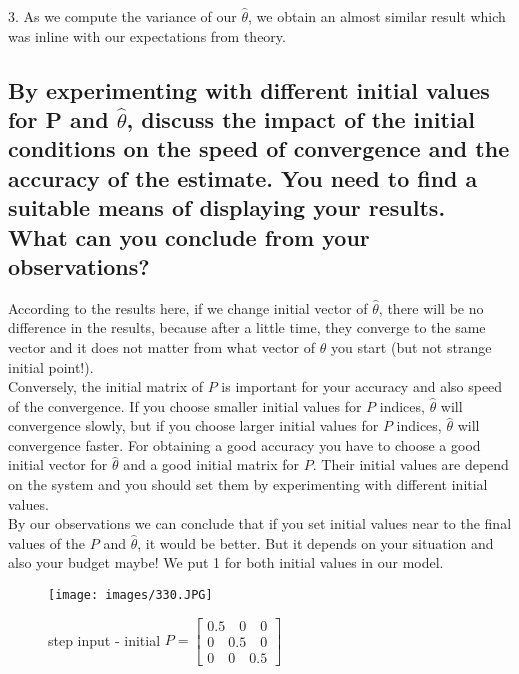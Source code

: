 \documentclass[11pt]{scrartcl} %
\begin{document}
3. As we compute the variance of our $\hat{\theta}$, we obtain an almost similar result which was inline with our expectations from theory.
\subsection{By experimenting with different initial values for P and $\hat{\theta}$, discuss the impact of the initial conditions
on the speed of convergence and the accuracy of the estimate. You need to find a suitable means of displaying your results. What can you conclude from your observations?}

According to the results here, if we change initial vector of $\hat{\theta}$, there will be no difference in the results, because after a little time, they converge to the same vector and it does not matter from what vector of $\hat{\theta}$ you start (but not strange initial point!).\\


Conversely, the initial matrix of $P$ is important for your accuracy and also speed of the convergence. If you choose smaller initial values for $P$ indices, $\hat{\theta}$ will convergence slowly, but if you choose larger initial values for $P$ indices, $\hat{\theta}$ will convergence faster. For obtaining a good accuracy you have to choose a good initial vector for $\hat{\theta}$ and a good initial matrix for $P$. Their initial values are depend on the system and you should set them by experimenting with different initial values.\\


By our observations we can conclude that if you set initial values near to the final values of the $P$ and $\hat{\theta}$, it would be better. But it depends on your situation and also your budget maybe! We put 1 for both initial values in our model. \\


\begin{figure}[H]
	\centering
	\texttt{[image: images/330.JPG]}
	\caption{step input - initial $P = \left[\begin{array}{l}
0.5 \quad 0 \quad 0 \\
0 \quad 0.5 \quad 0\\
0 \quad 0 \quad 0.5
\end{array}\right]$}
\end{figure}\\
\end{document}
